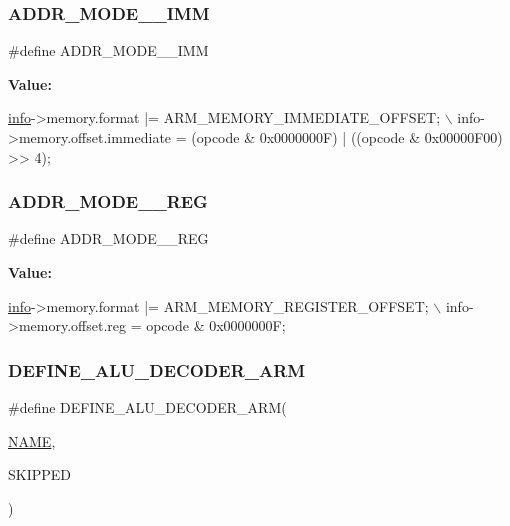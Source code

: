 \subsubsection{\texorpdfstring{A\+D\+D\+R\+\_\+\+M\+O\+D\+E\+\_\+\_\+\+I\+MM}{ADDR\_MODE\_3\_IMM}}
{\footnotesize\ttfamily \#define A\+D\+D\+R\+\_\+\+M\+O\+D\+E\+\_\+\_\+\+I\+MM}

{\bfseries Value\+:}
\begin{DoxyCode}
\mbox{\hyperlink{libretro_8h_structretro__game__info}{info}}->memory.format |= ARM\_MEMORY\_IMMEDIATE\_OFFSET; \(\backslash\)
    info->memory.offset.immediate = (opcode & 0x0000000F) | ((opcode & 0x00000F00) >> 4);
\end{DoxyCode}
\mbox{\label{decoder-arm_8c_a20938819535c2aad9bcabce8d0cd392e}} 
\subsubsection{\texorpdfstring{A\+D\+D\+R\+\_\+\+M\+O\+D\+E\+\_\+\_\+\+R\+EG}{ADDR\_MODE\_3\_REG}}
{\footnotesize\ttfamily \#define A\+D\+D\+R\+\_\+\+M\+O\+D\+E\+\_\+\_\+\+R\+EG}

{\bfseries Value\+:}
\begin{DoxyCode}
\mbox{\hyperlink{libretro_8h_structretro__game__info}{info}}->memory.format |= ARM\_MEMORY\_REGISTER\_OFFSET; \(\backslash\)
    info->memory.offset.reg = opcode & 0x0000000F;
\end{DoxyCode}
\mbox{\label{decoder-arm_8c_a4a46c1e899448a2f81ee8daec776f5f3}} 
\subsubsection{\texorpdfstring{D\+E\+F\+I\+N\+E\+\_\+\+A\+L\+U\+\_\+\+D\+E\+C\+O\+D\+E\+R\+\_\+\+A\+RM}{DEFINE\_ALU\_DECODER\_ARM}}
{\footnotesize\ttfamily \#define D\+E\+F\+I\+N\+E\+\_\+\+A\+L\+U\+\_\+\+D\+E\+C\+O\+D\+E\+R\+\_\+\+A\+RM(\begin{DoxyParamCaption}\item[{}]{\mbox{\hyperlink{inflate_8h_a164ea0159d5f0b5f12a646f25f99eceaa67bc2ced260a8e43805d2480a785d312}{N\+A\+ME}},  }\item[{}]{S\+K\+I\+P\+P\+ED }\end{DoxyParamCaption})}

